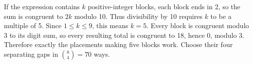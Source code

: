If the expression contains $k$ positive-integer blocks, each block ends in 2, so the sum is congruent to $2k$ modulo 10. Thus divisibility by 10 requires $k$ to be a multiple of 5. Since $1\le k\le9$, this means $k=5$. Every block is congruent modulo 3 to its digit sum, so every resulting total is congruent to 18, hence 0, modulo 3. Therefore exactly the placements making five blocks work. Choose their four separating gaps in $\boxed{\binom84=70}$ ways.

